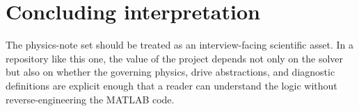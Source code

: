 \documentclass[11pt]{article}
\begin{document}
\section{Concluding interpretation}
The physics-note set should be treated as an interview-facing scientific asset. In a repository like this one, the value of the project depends not only on the solver but also on whether the governing physics, drive abstractions, and diagnostic definitions are explicit enough that a reader can understand the logic without reverse-engineering the MATLAB code.
\end{document}

